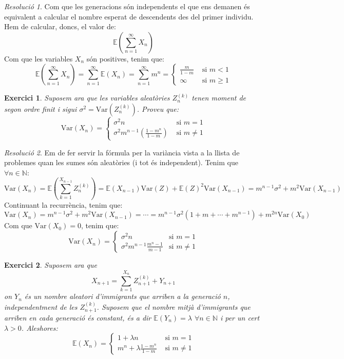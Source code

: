 \documentclass[10pt,a4paper]{article}
\newcommand{\NN}{\ensuremath{\mathbb{N}}} %
\newcommand{\Exp}{\mathbb{E}} %
\newcommand{\Var}{\mathrm{Var}} %
\newtheorem{exercici}{Exercici}
\theoremstyle{definition}
\theoremstyle{remark}
\newtheorem*{res}{Resolució}
\begin{document}
\begin{res}
  Com que les generacions són independents el que ens demanen és equivalent a calcular el nombre esperat de descendents des del primer individu. Hem de calcular, doncs, el valor de: $$\Exp\left(\sum_{n=1}^\infty X_n\right)$$
  Com que les variables $X_n$ són positives, tenim que:
  $$\Exp\left(\sum_{n=1}^\infty X_n\right)=\sum_{n=1}^\infty\Exp(X_n)=\sum_{n=1}^\infty m^n=
    \begin{cases}
      \frac{m}{1-m} & \text{ si $m <1$}     \\
      \infty        & \text{ si $m \geq 1$}
    \end{cases}$$
\end{res}
\begin{exercici}
  Suposem ara que les variables aleatòries $Z_n^{(k)}$ tenen moment de segon ordre finit i sigui $\sigma^2=\Var(Z_n^{(k)})$. Proveu que:
  $$\Var(X_n)=
    \begin{cases}
      \sigma^2 n                                    & \text{ si $m=1$}    \\
      \sigma^2m^{n-1}\left(\frac{1-m^n}{1-m}\right) & \text{ si $m\ne 1$}
    \end{cases}
  $$
\end{exercici}
\begin{res}
  Em de fer servir la fórmula per la variància vista a la llista de problemes quan les sumes són aleatòries (i tot és independent). Tenim que $\forall n\in\NN$:
  $$\Var(X_n)=\Exp\left(\sum_{k=1}^{X_{n-1}}Z_n^{(k)}\right)=\Exp(X_{n-1})\Var(Z)+{\Exp(Z)}^2\Var(X_{n-1})=m^{n-1}\sigma^2+m^2\Var(X_{n-1})$$
  Continuant la recurrència, tenim que:
  $$\Var(X_n)=m^{n-1}\sigma^2+m^2\Var(X_{n-1})=\cdots=m^{n-1}\sigma^2(1+m+\cdots+m^{n-1})+m^{2n}\Var(X_0)$$
  Com que $\Var(X_0)=0$, tenim que:
  $$
    \Var(X_n)=
    \begin{cases}
      \sigma^2n                        & \text{si $m=1$}    \\
      \sigma^2m^{n-1}\frac{m^n-1}{m-1} & \text{si $m\ne 1$}
    \end{cases}
  $$
\end{res}
\begin{exercici}
  Suposem ara que $$X_{n+1}=\sum_{k=1}^{X_n}Z_{n+1}^{(k)}+Y_{n+1}$$ on $Y_{n}$ és un nombre aleatori d'immigrants que arriben a la generació $n$, independentment de les $Z_{n+1}^{(k)}$. Suposem que el nombre mitjà d'immigrants que arriben en cada generació és constant, és a dir $\Exp(Y_n)=\lambda$ $\forall n\in\NN$ i per un cert $\lambda>0$. Aleshores:
  $$
    \Exp(X_n)=
    \begin{cases}
      1+ \lambda n                 & \text{ si $m=1$}    \\
      m^n+\lambda\frac{1-m^n}{1-m} & \text{ si $m\ne 1$}
    \end{cases}
  $$
\end{exercici}
\end{document}

